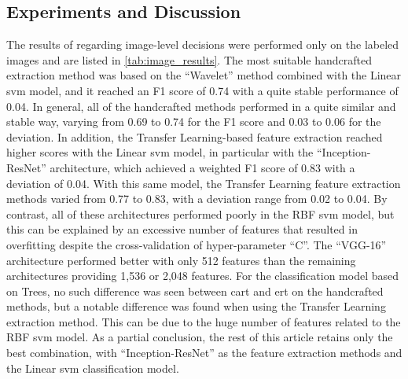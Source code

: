 \documentclass[journal,article,submit,moreauthors,pdftex, applsci]{Definitions/mdpi}
\begin{document}
\subsection{Experiments and Discussion}
The results of  regarding image-level decisions were performed only on the labeled images and are listed in \cref{tab:image_results}. The most suitable handcrafted extraction method was based on the “Wavelet” method combined with the Linear \ac{svm} model, and it reached an F1 score of 0.74 with a quite stable performance of 0.04. In general, all of the handcrafted methods performed in a quite similar and stable way, varying from 0.69 to 0.74 for the F1 score and 0.03 to 0.06 for the deviation. In addition, the Transfer Learning-based feature extraction reached higher scores with the Linear \ac{svm} model, in particular with the “Inception-ResNet” architecture, which achieved a weighted F1 score of 0.83 with a deviation of 0.04. With this same model, the Transfer Learning feature extraction methods varied from 0.77 to 0.83, with a deviation range from 0.02 to 0.04. By contrast, all of these architectures performed poorly in the RBF \ac{svm} model, but this can be explained by an excessive number of features that resulted in overfitting despite the cross-validation of hyper-parameter “C”. The “VGG-16” architecture performed better with only 512 features than the remaining architectures providing 1,536 or 2,048 features. For the classification model based on Trees, no such difference was seen between \ac{cart} and \ac{ert} on the handcrafted methods, but a notable difference was found when using the Transfer Learning extraction method. This can be due to the huge number of features related to the RBF \ac{svm} model. As a partial conclusion, the rest of this article retains only the best combination, with “Inception-ResNet” as the feature extraction methods and the Linear \ac{svm} classification model.\par
\end{document}
